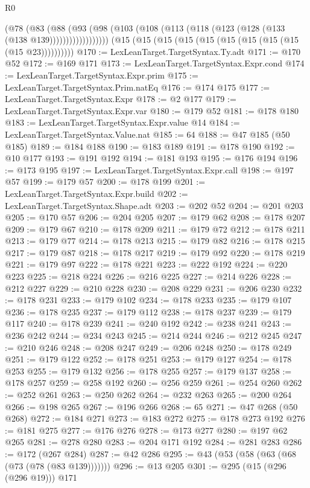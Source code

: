 \begin{lexlean}{R0}
\begin{coremodule}
              (@78
                (@83
                  (@88
                    (@93 (@98 (@103 (@108 (@113 (@118 (@123 (@128 (@133 (@138 @139))))))))))))))))))
    (@15 (@15 (@15 (@15 (@15 (@15 (@15 (@15 (@15 (@15 @23))))))))))
@170 := LexLeanTarget.TargetSyntax.Ty.adt
@171 := @170 @52
@172 := @169 @171
@173 := LexLeanTarget.TargetSyntax.Expr.cond
@174 := LexLeanTarget.TargetSyntax.Expr.prim
@175 := LexLeanTarget.TargetSyntax.Prim.natEq
@176 := @174 @175
@177 := LexLeanTarget.TargetSyntax.Expr
@178 := @2 @177
@179 := LexLeanTarget.TargetSyntax.Expr.var
@180 := @179 @52
@181 := @178 @180
@183 := LexLeanTarget.TargetSyntax.Expr.value @14
@184 := LexLeanTarget.TargetSyntax.Value.nat
@185 := 64
@188 := @47 @185 (@50 @185)
@189 := @184 @188
@190 := @183 @189
@191 := @178 @190
@192 := @10 @177
@193 := @191 @192
@194 := @181 @193
@195 := @176 @194
@196 := @173 @195
@197 := LexLeanTarget.TargetSyntax.Expr.call
@198 := @197 @57
@199 := @179 @57
@200 := @178 @199
@201 := LexLeanTarget.TargetSyntax.Expr.build
@202 := LexLeanTarget.TargetSyntax.Shape.adt
@203 := @202 @52
@204 := @201 @203
@205 := @170 @57
@206 := @204 @205
@207 := @179 @62
@208 := @178 @207
@209 := @179 @67
@210 := @178 @209
@211 := @179 @72
@212 := @178 @211
@213 := @179 @77
@214 := @178 @213
@215 := @179 @82
@216 := @178 @215
@217 := @179 @87
@218 := @178 @217
@219 := @179 @92
@220 := @178 @219
@221 := @179 @97
@222 := @178 @221
@223 := @222 @192
@224 := @220 @223
@225 := @218 @224
@226 := @216 @225
@227 := @214 @226
@228 := @212 @227
@229 := @210 @228
@230 := @208 @229
@231 := @206 @230
@232 := @178 @231
@233 := @179 @102
@234 := @178 @233
@235 := @179 @107
@236 := @178 @235
@237 := @179 @112
@238 := @178 @237
@239 := @179 @117
@240 := @178 @239
@241 := @240 @192
@242 := @238 @241
@243 := @236 @242
@244 := @234 @243
@245 := @214 @244
@246 := @212 @245
@247 := @210 @246
@248 := @208 @247
@249 := @206 @248
@250 := @178 @249
@251 := @179 @122
@252 := @178 @251
@253 := @179 @127
@254 := @178 @253
@255 := @179 @132
@256 := @178 @255
@257 := @179 @137
@258 := @178 @257
@259 := @258 @192
@260 := @256 @259
@261 := @254 @260
@262 := @252 @261
@263 := @250 @262
@264 := @232 @263
@265 := @200 @264
@266 := @198 @265
@267 := @196 @266
@268 := 65
@271 := @47 @268 (@50 @268)
@272 := @184 @271
@273 := @183 @272
@275 := @178 @273 @192
@276 := @181 @275
@277 := @176 @276
@278 := @173 @277
@280 := @197 @62 @265
@281 := @278 @280
@283 := @204 @171 @192
@284 := @281 @283
@286 := @172 (@267 @284)
@287 := @42 @286
@295 := @43 (@53 (@58 (@63 (@68 (@73 (@78 (@83 @139)))))))
@296 := @13 @205
@301 := @295 (@15 (@296 (@296 @19))) @171

\end{coremodule}
\end{lexlean}

